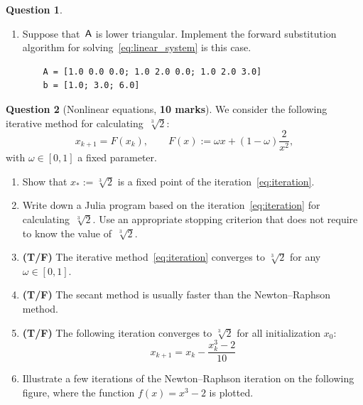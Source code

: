 \documentclass[10pt]{article}
\theoremstyle{definition}
\newtheorem{question}{Question}
\theoremstyle{remark}
\theoremstyle{plain}%
\begin{document}
\begin{question}
\begin{enumerate}
        \item
            Suppose that~$\mathsf A$ is lower triangular.
            Implement the forward substitution algorithm for solving~\eqref{eq:linear_system} is this case.
            \begin{verbatim}
    A = [1.0 0.0 0.0; 1.0 2.0 0.0; 1.0 2.0 3.0]
    b = [1.0; 3.0; 6.0]
            \end{verbatim}
    \end{enumerate}
\end{question}

\newpage
\begin{question}
    [Nonlinear equations, \textbf{10 marks}]
    We consider the following iterative method for calculating~$\sqrt[3]{2}$:
    \begin{equation}
        \label{eq:iteration}
        x_{k+1} = F(x_k), \qquad F(x) :=  \omega x + (1 - \omega) \frac{2}{x^2},
    \end{equation}
    with $\omega \in [0, 1]$ a fixed parameter.
    \begin{enumerate}
        \item
            Show that $x_* := \sqrt[3]{2}$ is a fixed point of the iteration~\eqref{eq:iteration}.
            \vspace{2cm}

        \item
            Write down a Julia program based on the iteration~\eqref{eq:iteration} for calculating~$\sqrt[3]{2}$.
            Use an appropriate stopping criterion that does not require to know the value of~$\sqrt[3]{2}$.
            \vspace{4cm}


        \item
            \textbf{(T/F)}
            The iterative method~\eqref{eq:iteration} converges to $\sqrt[3]{2}$ for any $\omega \in [0, 1]$.

        \item
            \textbf{(T/F)}
            The secant method is usually faster than the Newton--Raphson method.

        \item
            \textbf{(T/F)}
            The following iteration converges to $\sqrt[3]{2}$ for all initialization $x_0$:
            \[
                x_{k+1} = x_k - \frac{x_k^3 - 2}{10}
            \]

        \item
            \mymark{}
            Illustrate a few iterations of the Newton--Raphson iteration on the following figure,
            where the function $f(x) = x^3 - 2$ is plotted.
    \end{enumerate}
\end{question}
\end{document}
